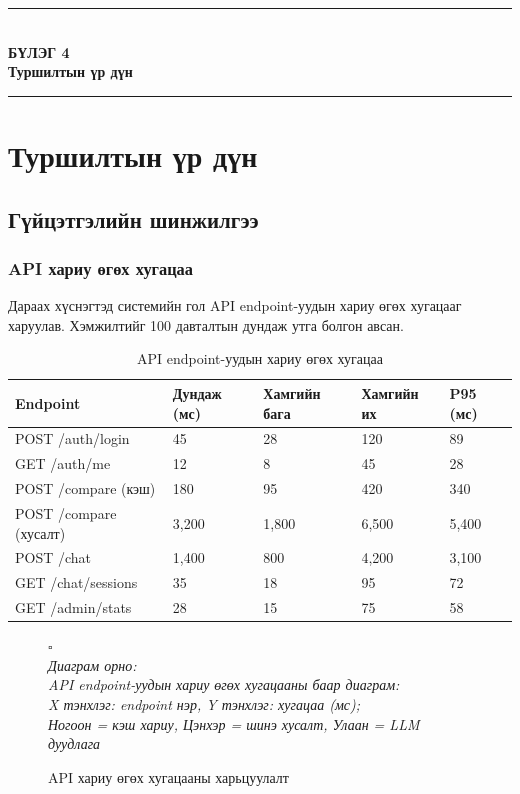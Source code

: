\documentclass[12pt,a4paper]{report}
\newcommand{\chappage}[2]{%
  \clearpage
  \thispagestyle{empty}
  \null\vfill
  \begin{center}
    \rule{0.60\textwidth}{0.8pt}\\[18pt]
    {\fontsize{22}{28}\selectfont\bfseries БҮЛЭГ #1}\\[12pt]
    {\Large\bfseries #2}\\[18pt]
    \rule{0.60\textwidth}{0.8pt}
  \end{center}
  \vfill\null
  \clearpage}
\newcommand{\figplaceholder}[2][7cm]{%
  \vspace{8pt}
  \begin{center}
    \colorbox{placeholderbg}{%
      \parbox[c][#1][c]{0.85\textwidth}{\centering
        {\color{darkgray!60}\Large $\square$}\\[8pt]
        {\color{darkgray}\itshape\small Диаграм орно:\\[4pt] #2}}}
  \end{center}
  \vspace{8pt}}
\begin{document}
\chappage{4}{Туршилтын үр дүн}

\chapter{Туршилтын үр дүн}

\section{Гүйцэтгэлийн шинжилгээ}

\subsection{API хариу өгөх хугацаа}

Дараах хүснэгтэд системийн гол API endpoint-уудын хариу өгөх хугацааг харуулав. Хэмжилтийг 100 давталтын дундаж утга болгон авсан.

\begin{table}[H]
\centering
\caption{API endpoint-уудын хариу өгөх хугацаа}
\label{tab:response_times}
\begin{tabularx}{\textwidth}{@{}lXXXX@{}}
\toprule
\textbf{Endpoint} & \textbf{Дундаж (мс)} & \textbf{Хамгийн бага} & \textbf{Хамгийн их} & \textbf{P95 (мс)} \\
\midrule
POST /auth/login & 45 & 28 & 120 & 89 \\
GET /auth/me & 12 & 8 & 45 & 28 \\
POST /compare (кэш) & 180 & 95 & 420 & 340 \\
POST /compare (хусалт) & 3,200 & 1,800 & 6,500 & 5,400 \\
POST /chat & 1,400 & 800 & 4,200 & 3,100 \\
GET /chat/sessions & 35 & 18 & 95 & 72 \\
GET /admin/stats & 28 & 15 & 75 & 58 \\
\bottomrule
\end{tabularx}
\end{table}

\begin{figure}[H]
  \centering
  \figplaceholder[9cm]{API endpoint-уудын хариу өгөх хугацааны баар диаграм:\\ X тэнхлэг: endpoint нэр, Y тэнхлэг: хугацаа (мс);\\ Ногоон = кэш хариу, Цэнхэр = шинэ хусалт, Улаан = LLM дуудлага}
  \caption{API хариу өгөх хугацааны харьцуулалт}
  \label{fig:response_times}
\end{figure}
\end{document}
